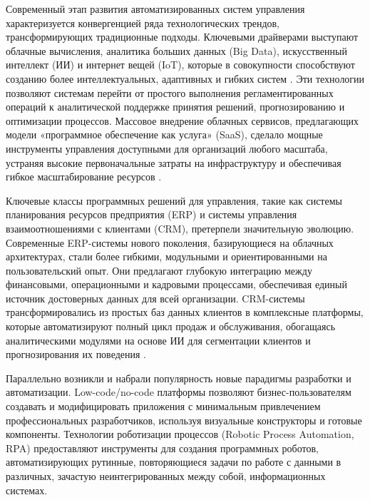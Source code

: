 \documentclass{SibFU-docs}
\begin{document}
Современный этап развития автоматизированных систем управления характеризуется конвергенцией ряда технологических трендов, трансформирующих традиционные подходы. Ключевыми драйверами выступают облачные вычисления, аналитика больших данных (Big Data), искусственный интеллект (ИИ) и интернет вещей (IoT), которые в совокупности способствуют созданию более интеллектуальных, адаптивных и гибких систем \cite{gartner-2024}. Эти технологии позволяют системам перейти от простого выполнения регламентированных операций к аналитической поддержке принятия решений, прогнозированию и оптимизации процессов. Массовое внедрение облачных сервисов, предлагающих модели «программное обеспечение как услуга» (SaaS), сделало мощные инструменты управления доступными для организаций любого масштаба, устраняя высокие первоначальные затраты на инфраструктуру и обеспечивая гибкое масштабирование ресурсов \cite{deloitte-erp-cloud-2023}.


Ключевые классы программных решений для управления, такие как системы планирования ресурсов предприятия (ERP) и системы управления взаимоотношениями с клиентами (CRM), претерпели значительную эволюцию. Современные ERP-системы нового поколения, базирующиеся на облачных архитектурах, стали более гибкими, модульными и ориентированными на пользовательский опыт. Они предлагают глубокую интеграцию между финансовыми, операционными и кадровыми процессами, обеспечивая единый источник достоверных данных для всей организации. CRM-системы трансформировались из простых баз данных клиентов в комплексные платформы, которые автоматизируют полный цикл продаж и обслуживания, обогащаясь аналитическими модулями на основе ИИ для сегментации клиентов и прогнозирования их поведения \cite{mckinsey-automation-2023}.

Параллельно возникли и набрали популярность новые парадигмы разработки и автоматизации. Low-code/no-code платформы позволяют бизнес-пользователям создавать и модифицировать приложения с минимальным привлечением профессиональных разработчиков, используя визуальные конструкторы и готовые компоненты. Технологии роботизации процессов (Robotic Process Automation, RPA) предоставляют инструменты для создания программных роботов, автоматизирующих рутинные, повторяющиеся задачи по работе с данными в различных, зачастую неинтегрированных между собой, информационных системах.

\end{document}
